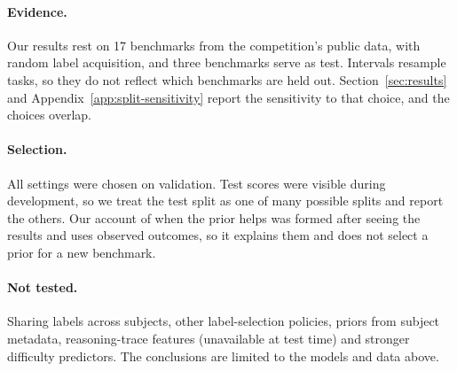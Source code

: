 \label{sec:limitations}
\paragraph{Evidence.} Our results rest on 17 benchmarks from the competition's public data, with random label acquisition, and three benchmarks serve as test. Intervals resample tasks, so they do not reflect which benchmarks are held out. Section~\ref{sec:results} and Appendix~\ref{app:split-sensitivity} report the sensitivity to that choice, and the choices overlap.

\paragraph{Selection.} All settings were chosen on validation. Test scores were visible during development, so we treat the test split as one of many possible splits and report the others. Our account of when the prior helps was formed after seeing the results and uses observed outcomes, so it explains them and does not select a prior for a new benchmark.

\paragraph{Not tested.} Sharing labels across subjects, other label-selection policies, priors from subject metadata, reasoning-trace features (unavailable at test time) and stronger difficulty predictors. The conclusions are limited to the models and data above.

